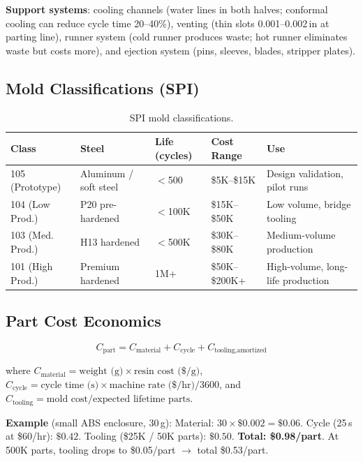 \documentclass[11pt,letterpaper,twoside,openany]{book}
\begin{document}
\textbf{Support systems}: cooling channels (water lines in both halves; conformal cooling can reduce cycle time 20--40\%), venting (thin slots 0.001--0.002\,in at parting line), runner system (cold runner produces waste; hot runner eliminates waste but costs more), and ejection system (pins, sleeves, blades, stripper plates).

\subsection{Mold Classifications (SPI)}

\begin{table}[ht!]
\centering\small
\begin{tabularx}{\textwidth}{l l l l X}
  \toprule
  \textbf{Class} & \textbf{Steel} & \textbf{Life (cycles)} & \textbf{Cost Range} & \textbf{Use} \\
  \midrule
  105 (Prototype) & Aluminum / soft steel & $<$500 & \$5K--\$15K & Design validation, pilot runs \\
  104 (Low Prod.) & P20 pre-hardened & $<$100K & \$15K--\$50K & Low volume, bridge tooling \\
  103 (Med. Prod.) & H13 hardened & $<$500K & \$30K--\$80K & Medium-volume production \\
  101 (High Prod.) & Premium hardened & 1M+ & \$50K--\$200K+ & High-volume, long-life production \\
  \bottomrule
\end{tabularx}
\caption{SPI mold classifications.}
\end{table}

\subsection{Part Cost Economics}

\begin{equation}
  C_{\text{part}} = C_{\text{material}} + C_{\text{cycle}} + C_{\text{tooling,amortized}}
\end{equation}

where $C_{\text{material}} = \text{weight (g)} \times \text{resin cost (\$/g)}$, $C_{\text{cycle}} = \text{cycle time (s)} \times \text{machine rate (\$/hr)} / 3600$, and $C_{\text{tooling}} = \text{mold cost} / \text{expected lifetime parts}$.

\textbf{Example} (small ABS enclosure, 30\,g): Material: $30 \times \$0.002 = \$0.06$. Cycle (25\,s at \$60/hr): $\$0.42$. Tooling (\$25K / 50K parts): $\$0.50$. \textbf{Total: \$0.98/part}. At 500K parts, tooling drops to \$0.05/part $\to$ total \$0.53/part.
\end{document}
